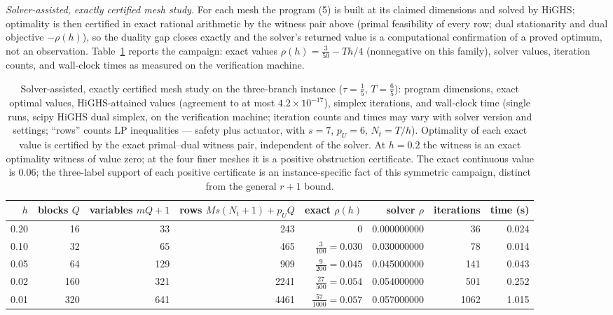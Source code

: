\documentclass[10pt,twocolumn]{article}
\theoremstyle{plain}
\theoremstyle{definition}
\theoremstyle{remark}
\begin{document}
\emph{Solver-assisted, exactly certified mesh study.} For each mesh the
program (5) is built
at its claimed dimensions and solved by HiGHS; optimality is then certified
in exact rational arithmetic by the witness pair above (primal feasibility of
every row; dual stationarity and dual objective \(-\rho(h)\)), so the duality
gap closes exactly and the solver's returned value is a computational
confirmation of a proved optimum, not an observation.
Table~\ref{tab:mesh} reports the campaign: exact values
\(\rho(h) = \tfrac{3}{50} - Th/4\) (nonnegative on this family), solver values, iteration
counts, and wall-clock times as measured on the verification machine.

\begin{table}[t]
\centering
\footnotesize
\begin{tabular}{@{}r|r|r|r|r|r|r|r@{}}
\toprule
\(h\) & blocks \(Q\) & variables \(mQ{+}1\) & rows \(Ms(N_t{+}1)+p_UQ\) & exact \(\rho(h)\) & solver \(\rho\) & iterations & time (s) \\
\midrule
0.20 & 16 & 33  & 243  & \(0\) & 0.000000000 & 36   & 0.024 \\
0.10 & 32 & 65  & 465  & \(\tfrac{3}{100} = 0.030\) & 0.030000000 & 78   & 0.014 \\
0.05 & 64 & 129 & 909  & \(\tfrac{9}{200} = 0.045\) & 0.045000000 & 141  & 0.043 \\
0.02 & 160 & 321 & 2241 & \(\tfrac{27}{500} = 0.054\) & 0.054000000 & 501  & 0.252 \\
0.01 & 320 & 641 & 4461 & \(\tfrac{57}{1000} = 0.057\) & 0.057000000 & 1062 & 1.015 \\
\bottomrule
\end{tabular}
\caption{Solver-assisted, exactly certified mesh study on the three-branch
instance (\(\tau = \tfrac15\), \(T = \tfrac65\)): program dimensions,
exact optimal values, HiGHS-attained values (agreement to at most
\(4.2 \times 10^{-17}\)), simplex iterations, and wall-clock time (single
runs, scipy HiGHS dual simplex, on the verification machine; iteration
counts and times may vary with solver version and settings; ``rows'' counts
LP inequalities --- safety plus actuator, with \(s = 7\), \(p_U = 6\),
\(N_t = T/h\)). Optimality of each exact value is certified by the exact
primal--dual witness pair, independent of the solver. At \(h = 0.2\) the
witness is an exact optimality witness of value zero; at the four finer
meshes it is a positive obstruction certificate. The exact continuous value
is \(0.06\); the three-label support of each positive certificate is an
instance-specific fact of this symmetric campaign, distinct from the
general \(r + 1\) bound.}
\label{tab:mesh}
\end{table}
\end{document}
